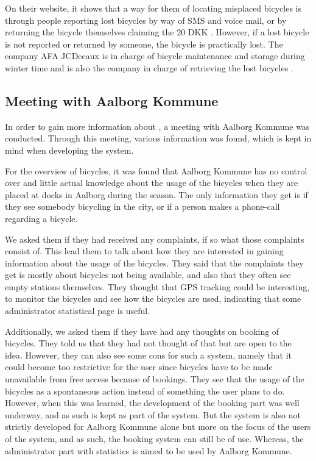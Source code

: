 On their website, it shows that a way for them of locating misplaced bicycles is through people reporting lost bicycles by way of SMS and voice mail, or by returning the bicycle themselves claiming the 20 DKK \citep{misc:aalborgbycykelmangler}.
However, if a lost bicycle is not reported or returned by someone, the bicycle is practically lost.
The company AFA JCDecaux is in charge of bicycle maintenance and storage during winter time and is also the company in charge of retrieving the lost bicycles \citep{misc:aalborgcykling}.

\subsection{Meeting with Aalborg Kommune}\label{subsec:meetingaalborg}
In order to gain more information about \bycykelwithoutspace, a meeting with Aalborg Kommune was conducted. 
Through this meeting, various information was found, which is kept in mind when developing the system.

For the overview of bicycles, it was found that Aalborg Kommune has no control over and little actual knowledge about the usage of the bicycles when they are placed at docks in Aalborg during the season.
The only information they get is if they see somebody bicycling in the city, or if a person makes a phone-call regarding a bicycle.

We asked them if they had received any complaints, if so what those complaints consist of.
This lead them to talk about how they are interested in gaining information about the usage of the bicycles.
They said that the complaints they get is mostly about bicycles not being available, and also that they often see empty stations themselves.
They thought that GPS tracking could be interesting, to monitor the bicycles and see how the bicycles are used, indicating that some administrator statistical page is useful.

Additionally, we asked them if they have had any thoughts on booking of bicycles.
They told us that they had not thought of that but are open to the idea.
However, they can also see some cons for such a system, namely that it could become too restrictive for the user since bicycles have to be made unavailable from free access because of bookings.
They see that the usage of the bicycles as a spontaneous action instead of something the user plans to do.
However, when this was learned, the development of the booking part was well underway, and as such is kept as part of the system.
But the system is also not strictly developed for Aalborg Kommune alone but more on the focus of the users of the system, and as such, the booking system can still be of use.
Whereas, the administrator part with statistics is aimed to be used by Aalborg Kommune.

